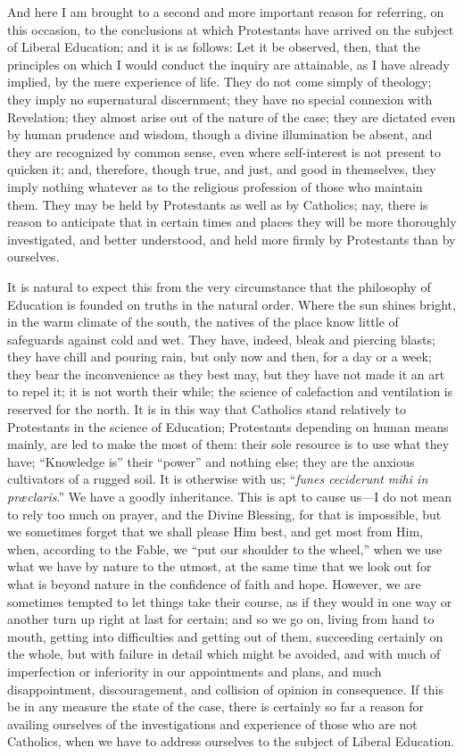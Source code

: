 And here I am brought to a second and more important reason for
referring, on this occasion, to the conclusions at which Protestants
have arrived on the subject of Liberal Education; and it is as
follows: Let it be observed, then, that the principles on which I
would conduct the inquiry are attainable, as I have already implied,
by the mere experience of life. They do not come simply of
theology; they imply no supernatural discernment; they have no special
connexion with Revelation; they almost arise out of the nature of the
case; they are dictated even by human prudence and wisdom, though a
divine illumination be absent, and they are recognized by common
sense, even where self-interest is not present to quicken it; and,
therefore, though true, and just, and good in themselves, they imply
nothing whatever as to the religious profession of those who maintain
them. They may be held by Protestants as well as by Catholics; nay,
there is reason to anticipate that in certain times and places they
will be more thoroughly investigated, and better understood, and held
more firmly by Protestants than by ourselves.

It is natural to expect this from the very circumstance that the
philosophy of Education is founded on truths in the natural order.
Where the sun shines bright, in the warm climate of the south, the
natives of the place know little of safeguards against cold and wet.
They have, indeed, bleak and piercing blasts; they have chill and
pouring rain, but only now and then, for a day or a week; they bear
the inconvenience as they best may, but they have not made it an art
to repel it; it is not worth their while; the science of calefaction
and ventilation is reserved for the north. It is in this way that
Catholics stand relatively to Protestants in the science of Education;
Protestants depending on human means mainly, are led to make the most
of them: their sole resource is to use what they have; ``Knowledge
is'' their ``power'' and nothing else; they are the
anxious cultivators of a rugged soil. It is otherwise with us; ``\emph{funes
ceciderunt mihi in præclaris}.'' We have a goodly inheritance.
This is apt to cause us—I do not mean to rely too much on prayer, and the Divine Blessing, for that is impossible, but we
sometimes forget that we shall please Him best, and get most from Him,
when, according to the Fable, we ``put our shoulder to the
wheel,'' when we use what we have by nature to the utmost, at the
same time that we look out for what is beyond nature in the confidence
of faith and hope. However, we are sometimes tempted to let things
take their course, as if they would in one way or another turn up
right at last for certain; and so we go on, living from hand to mouth,
getting into difficulties and getting out of them, succeeding
certainly on the whole, but with failure in detail which might be
avoided, and with much of imperfection or inferiority in our
appointments and plans, and much disappointment, discouragement, and
collision of opinion in consequence. If this be in any measure the
state of the case, there is certainly so far a reason for availing
ourselves of the investigations and experience of those who are not
Catholics, when we have to address ourselves to the subject of Liberal
Education.


